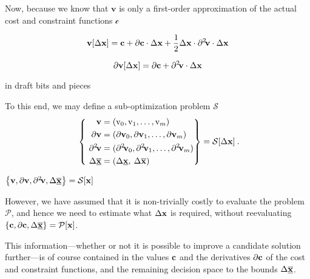 \documentclass[11pt]{article}
\begin{document}
Now, because we know that $\textbf{v}$ is only a first-order approximation of the actual cost and constraint functions $\mathcal{c}$


\begin{equation}
\textbf{v}[\Delta \mathbf{x}] = \mathbf{c} + \partial \mathbf{c} \cdot \Delta \mathbf{x} + \frac{1}{2} \Delta \mathbf{x} \cdot \partial^{2}\!\mathbf{v} \cdot \Delta \mathbf{x}
\end{equation}

\begin{equation}
\partial \textbf{v}[\Delta \mathbf{x}] =  \partial \mathbf{c} + \partial^{2}\!\mathbf{v} \cdot  \Delta \mathbf{x}
\end{equation}


\bigskip

in draft bits and pieces

\bigskip


To this end, we may define a sub-optimization problem $\mathcal{S}$
\begin{align}
\label{d:eqn:p}
 ~\left\{ ~
\begin{aligned}
\mathbf{v} &= (\textrm{v}_0, \textrm{v}_1, \ldots, \textrm{v}_m ) \\
\mathbf{\partial v} & = (\mathbf{\partial v}_0 , \mathbf{\partial v}_1 , \ldots,\mathbf{\partial v}_m  ) \\
\partial^{2}\!\mathbf{v} & = (\partial^2\!\mathbf{ v}_0 , \partial^2\!\mathbf{ v}_1 , \ldots,\partial^2\!\mathbf{ v}_m  ) \\
\Delta \underline{\overline{\mathbf{x}}} & = ( \Delta \underline{\mathbf{x}} , \: \Delta \overline{\mathbf{x}} ) \:
\end{aligned}\right\} =
\mathcal{S} [\Delta \mathbf{x}] \: .
\end{align}
\bigskip

 $\left\{\mathbf{v}, \partial \mathbf{v}, \partial^2\!\mathbf{ v},   \Delta \underline{\overline{\mathbf{x}}}\right\}=\mathcal{S}[\mathbf{x}]$ 



However, we have assumed that it is non-trivially costly to evaluate the problem $\mathcal{P}$, and hence we need to estimate what $\Delta\mathbf{x}$ is required, without reevaluating $\left\{\mathbf{c}, \partial \mathbf{c}, \Delta \underline{\overline{\mathbf{x}}}\right\}=\mathcal{P}[\mathbf{x}]$. 


This information---whether or not it is possible to improve a candidate solution further---is of course contained in the values $\mathbf{c}$ and the derivatives $\mathbf{\partial c}$ of the cost and constraint functions, and the remaining decision space to the bounds $\Delta \underline{\overline{\mathbf{x}}}$.
\end{document}
